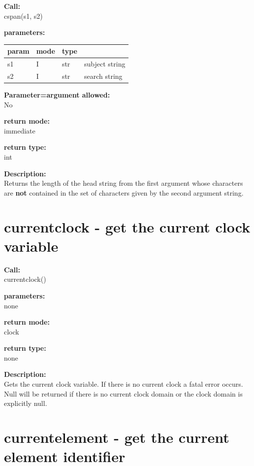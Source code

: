        {\bf Call:} \\
        cspan(s1, s2)
        
        {\bf parameters:} \\
        \begin{tabular}{| l | l | l | l |}
        \hline
        param  & mode & type & \\
        \hline \hline
        s1 & I & str & subject string   \\ \hline
        s2 & I & str & search string    \\ \hline
        \end{tabular}
        
        {\bf Parameter=argument allowed:} \\
        No
        
        {\bf return mode:} \\
        immediate

        {\bf return type:} \\
        int
        
        {\bf Description:} \\
        Returns the length of the head string from the first argument whose characters are
        {\bf not} contained in the set of characters given by the second
        argument string.


    \section{currentclock - get the current clock variable}\label{sec:ifcurrentclock}
        
        {\bf Call:} \\
        currentclock()
        
        {\bf parameters:} \\
        none
        
        {\bf return mode:} \\
        clock

        {\bf return type:} \\
        none
        
        {\bf Description:} \\
        Gets the current clock variable. If there is no current clock
        a fatal error occurs. Null will be returned if there
        is no current clock domain or the clock domain is explicitly
        null.



    \section{currentelement - get the current element identifier}\label{sec:ifcurrentelement}
        
